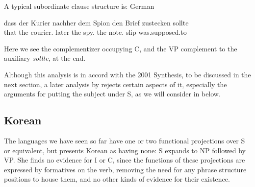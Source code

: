 \documentclass[output=paper,hidelinks]{langscibook}
\begin{document}
A typical subordinate clause structure is:
\ea\label{germansub} German \citep[27, ex.~20]{Choi1999}
\begin{xlist}
\item
\gll dass der Kurier nachher dem Spion den Brief zustecken sollte\\
that the courier.{\NOM} later the spy.{\DAT} the note.{\ACC} slip was.supposed.to\\
\item
{}
\end{xlist}
\z
Here we see the complementizer occupying C, and the VP complement to the auxiliary
{\it sollte}, at the end.

Although this analysis is in accord with the 2001 Synthesis, to be discussed in
the next section, a later analysis by \citet{Berman2003} rejects certain aspects
of it, especially the arguments for putting the subject under S, as we will consider
in  below.


\subsection{Korean}
The languages we have seen so far have one or two functional projections over S
or equivalent, but \citet{Choi1999} presents Korean as having none: S expands
to NP followed by VP.  She finds no evidence for I or C, since the
functions of these projections
are expressed by formatives on the verb, removing the need for any phrase
structure positions to house them, and no other kinds of evidence for their
existence. 
\end{document}
